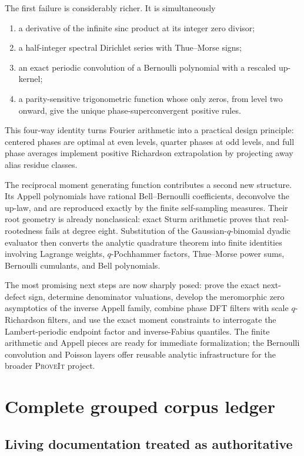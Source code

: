 \documentclass[11pt]{article}
\numberwithin{equation}{section}
\theoremstyle{definition}
\theoremstyle{remark}
\newcommand{\repo}{\textsc{ProveIt}}
\begin{document}
The first failure is considerably richer.  It is simultaneously
\begin{enumerate}
\item a derivative of the infinite sinc product at its integer zero divisor;
\item a half-integer spectral Dirichlet series with Thue--Morse signs;
\item an exact periodic convolution of a Bernoulli polynomial with a rescaled up-kernel;
\item a parity-sensitive trigonometric function whose only zeros, from level two onward, give the unique phase-superconvergent positive rules.
\end{enumerate}
This four-way identity turns Fourier arithmetic into a practical design principle: centered phases are optimal at even levels, quarter phases at odd levels, and full phase averages implement positive Richardson extrapolation by projecting away alias residue classes.

The reciprocal moment generating function contributes a second new structure.  Its Appell polynomials have rational Bell--Bernoulli coefficients, deconvolve the up-law, and are reproduced exactly by the finite self-sampling measures.  Their root geometry is already nonclassical: exact Sturm arithmetic proves that real-rootedness fails at degree eight.  Substitution of the Gaussian-$q$-binomial dyadic evaluator then converts the analytic quadrature theorem into finite identities involving Lagrange weights, $q$-Pochhammer factors, Thue--Morse power sums, Bernoulli cumulants, and Bell polynomials.

The most promising next steps are now sharply posed: prove the exact next-defect sign, determine denominator valuations, develop the meromorphic zero asymptotics of the inverse Appell family, combine phase DFT filters with scale $q$-Richardson filters, and use the exact moment constraints to interrogate the Lambert-periodic endpoint factor and inverse-Fabius quantiles.  The finite arithmetic and Appell pieces are ready for immediate formalization; the Bernoulli convolution and Poisson layers offer reusable analytic infrastructure for the broader \repo{} project.

\appendix

\section{Complete grouped corpus ledger}
\label{app:corpus}

\subsection{Living documentation treated as authoritative}
\end{document}
